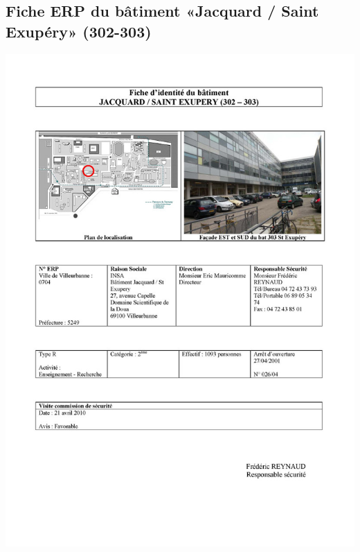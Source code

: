 \documentclass[hidelinks, paper=a4, fontsize=13pt]{report}
\begin{document}
\subsection{Fiche ERP du bâtiment «Jacquard / Saint Exupéry» (302-303)}
\begin{center}
\includegraphics[scale=0.5]{Annexes/Documents/ERPJacquard}
\end{center}
\end{document}
